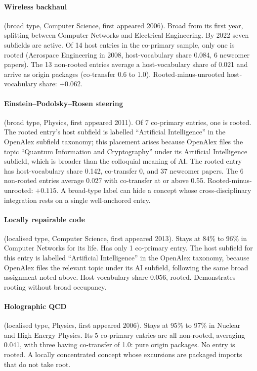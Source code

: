 \documentclass[11pt,letterpaper]{article}
\begin{document}
\paragraph{Wireless backhaul} (broad type, Computer Science, first appeared 2006). Broad from its first year,
splitting between Computer Networks and Electrical Engineering. By 2022 seven subfields are active. Of 14 host
entries in the co-primary sample, only one is rooted (Aerospace Engineering in 2008, host-vocabulary share
0.084, 6 newcomer papers). The 13 non-rooted entries average a host-vocabulary share of 0.021 and arrive as
origin packages (co-transfer 0.6 to 1.0). Rooted-minus-unrooted host-vocabulary share: $+0.062$.

\paragraph{Einstein--Podolsky--Rosen steering} (broad type, Physics, first appeared 2011). Of 7 co-primary
entries, one is rooted. The rooted entry's host subfield is labelled ``Artificial Intelligence'' in the
OpenAlex subfield taxonomy; this placement arises because OpenAlex files the topic ``Quantum Information
and Cryptography'' under its Artificial Intelligence subfield, which is broader than the colloquial meaning
of AI. The rooted entry has host-vocabulary share 0.142, co-transfer 0,
and 37 newcomer papers. The 6 non-rooted entries average 0.027 with co-transfer at or above 0.55.
Rooted-minus-unrooted: $+0.115$. A broad-type label can hide a concept whose cross-disciplinary integration
rests on a single well-anchored entry.

\paragraph{Locally repairable code} (localised type, Computer Science, first appeared 2013). Stays at 84\% to
96\% in Computer Networks for its life. Has only 1 co-primary entry. The host subfield for this entry is
labelled ``Artificial Intelligence'' in the OpenAlex taxonomy, because OpenAlex files the relevant topic under
its AI subfield, following the same broad assignment noted above.
Host-vocabulary share 0.056, rooted. Demonstrates rooting without broad occupancy.

\paragraph{Holographic QCD} (localised type, Physics, first appeared 2006). Stays at 95\% to 97\% in Nuclear
and High Energy Physics. Its 5 co-primary entries are all non-rooted, averaging 0.041, with three having
co-transfer of 1.0: pure origin packages. No entry is rooted. A locally concentrated concept whose excursions
are packaged imports that do not take root.
\end{document}

